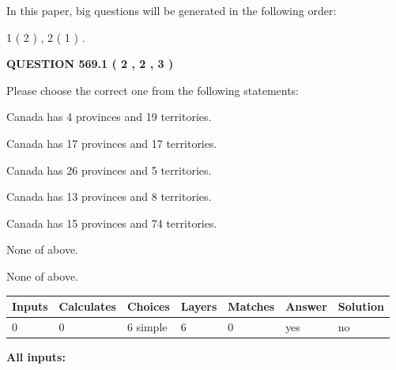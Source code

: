 \documentclass[12pt]{article}
\begin{document}
In this paper, big questions will be generated in the following order: 
   
   
   1 ( 2 )
 ,
   2 ( 1 )
 .
  
\vspace{0.2in}
  
{\textbf{\Large{QUESTION
569.1 
 ( 2 , 2 , 3 )
}}}
  
  
Please choose the correct one from the following statements:
 
 
Canada has   4 provinces and  19 territories.
 
 
Canada has  17 provinces and  17 territories.
 
 
Canada has  26 provinces and  5 territories.
 
 
Canada has  13 provinces and  8 territories.
 
 
Canada has  15 provinces and  74 territories.
 
 
 None of above.
 
 
\noindent{}
 
 
 None of above.
 
 
\noindent{}
 
 
   
   
   
   
\noindent\begin{tabular}{|l|l|l|l|l|l|l|}
 \hline
Inputs & Calculates & Choices & Layers & Matches & Answer & Solution \\ \hline
 0  & 
 0  & 
 6
  simple  
  & 
 6  & 
 0  & 
  yes & 
  no 
  \\ \hline
 \end{tabular}
   
   
   
   
\noindent{}
   
   
   
   
\noindent\vspace{0.1in}\hspace{-0.08in} {\textbf{\Large{All inputs: }}}
   
   
  
\end{document}
